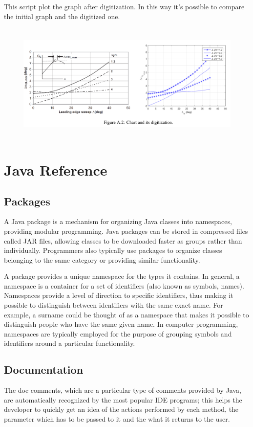 \noindent \\ \\ 
This script plot the graph after digitization. In this way it's possible to compare the initial graph and the digitized one.


 \begin{figure}[H]
\centering
{\includegraphics[height=6cm]{Immagini/digitize2.png}} 
\label{angles}
\end{figure} 


\chapter{Java Reference}


\section{Packages}\label{sec:package}
A Java package is a mechanism for organizing Java classes into namespaces, providing modular programming. Java packages can be stored in compressed files called JAR files, allowing classes to be downloaded faster as groups rather than individually. Programmers also typically use packages to organize classes belonging to the same category or providing similar functionality.

A package provides a unique namespace for the types it contains.
In general, a namespace is a container for a set of identifiers (also known as symbols, names). Namespaces provide a level of direction to specific identifiers, thus making it possible to distinguish between identifiers with the same exact name. For example, a surname could be thought of as a namespace that makes it possible to distinguish people who have the same given name. In computer programming, namespaces are typically employed for the purpose of grouping symbols and identifiers around a particular functionality.

\section{Documentation}
The doc comments, which are a particular type of comments provided by Java, are automatically recognized by the most popular IDE programs; this helps the developer to quickly get an idea of the actions performed by each method, the parameter which has to be passed to it and the what it returns to the user.



